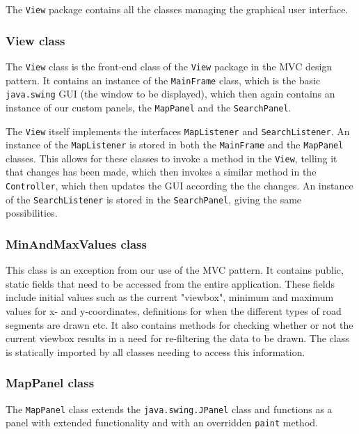The \texttt{View} package contains all the classes managing the graphical user interface.


\subsubsection{View class} %
The \texttt{View} class is the front-end class of the \texttt{View} package in the MVC design pattern. It contains an instance of the \texttt{MainFrame} class, which is the basic \texttt{java.swing} GUI (the window to be displayed), which then again contains an instance of our custom panels, the \texttt{MapPanel} and the \texttt{SearchPanel}.

The \texttt{View} itself implements the interfaces \texttt{MapListener} and \texttt{SearchListener}. An instance of the \texttt{MapListener} is stored in both the \texttt{MainFrame} and the \texttt{MapPanel} classes. This allows for these classes to invoke a method in the \texttt{View}, telling it that changes has been made, which then invokes a similar method in the \texttt{Controller}, which then updates the GUI according the the changes. An instance of the \texttt{SearchListener} is stored in the \texttt{SearchPanel}, giving the same possibilities.

\subsubsection{MinAndMaxValues class}
This class is an exception from our use of the MVC pattern. It contains public, static fields that need to be accessed from the entire application. These fields include initial values such as the current "viewbox", minimum and maximum values for x- and y-coordinates, definitions for when the different types of road segments are drawn etc. It also contains methods for checking whether or not the current viewbox results in a need for re-filtering the data to be drawn. The class is statically imported by all classes needing to access this information.

\subsubsection{MapPanel class} %
The \texttt{MapPanel} class extends the \texttt{java.swing.JPanel} class and functions as a panel with extended functionality and with an overridden \texttt{paint} method.

